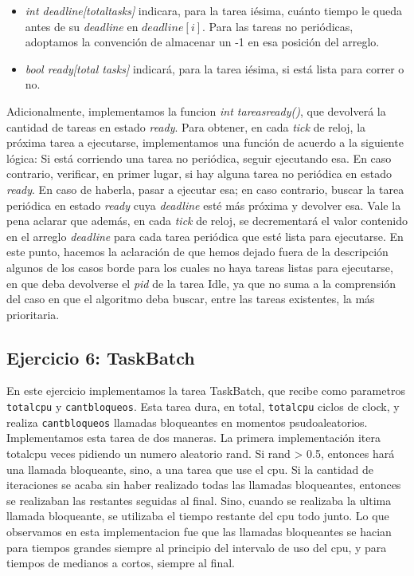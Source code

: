 \begin{itemize}
  \item \textit{int deadline[totaltasks]} indicara, para la tarea i\'esima, cu\'anto tiempo le queda antes de su \textit{deadline} en $deadline[i]$. Para las tareas
  no peri\'odicas, adoptamos la convenci\'on de almacenar un -1 en esa posici\'on del arreglo.
  \item \textit{bool ready[total tasks]} indicar\'a, para la tarea i\'esima, si est\'a lista para correr o no.
\end{itemize}

Adicionalmente, implementamos la funcion \textit{int tareasready()}, que devolver\'a la cantidad de tareas en estado \textit{ready}.
Para obtener, en cada \textit{tick} de reloj, la pr\'oxima tarea a ejecutarse, implementamos una funci\'on de acuerdo a la siguiente l\'ogica:
Si est\'a corriendo una tarea no peri\'odica, seguir ejecutando esa. En caso contrario, verificar, en primer lugar, si hay alguna tarea
no peri\'odica en estado \textit{ready}. En caso de haberla, pasar a ejecutar esa; en caso contrario, buscar la tarea peri\'odica en estado
\textit{ready} cuya \textit{deadline} est\'e m\'as pr\'oxima y devolver esa. Vale la pena aclarar
que adem\'as, en cada \textit{tick} de reloj, se decrementar\'a el valor contenido en el arreglo \textit{deadline} para cada tarea peri\'odica que est\'e
lista para ejecutarse. En este punto, hacemos la aclaraci\'on de que hemos dejado fuera de la descripci\'on algunos de los casos borde para los cuales no 
haya tareas listas para ejecutarse, en que deba devolverse el \textit{pid} de la tarea Idle, ya que no suma a la comprensi\'on del caso en que el algoritmo
deba buscar, entre las tareas existentes, la m\'as prioritaria.

\subsection{Ejercicio 6: TaskBatch}

En este ejercicio implementamos la tarea TaskBatch, que recibe como parametros \verb|totalcpu| y \verb|cantbloqueos|. Esta tarea dura, en total, \verb|totalcpu| 
ciclos de clock, y realiza \verb|cantbloqueos| llamadas bloqueantes en momentos psudoaleatorios. Implementamos esta tarea de dos maneras. La primera implementaci\'on itera totalcpu
veces pidiendo un numero aleatorio rand. Si rand > 0.5, entonces har\'a una llamada bloqueante, sino, a una tarea que use el cpu. Si la cantidad 
de iteraciones se acaba sin haber realizado todas las llamadas bloqueantes, entonces se realizaban las restantes seguidas al final. Sino, cuando se realizaba
la ultima llamada bloqueante, se utilizaba el tiempo restante del cpu todo junto. Lo que observamos en esta implementacion fue que las llamadas bloqueantes
se hacian para tiempos grandes siempre al principio del intervalo de uso del cpu, y para tiempos de medianos a cortos, siempre al final.


